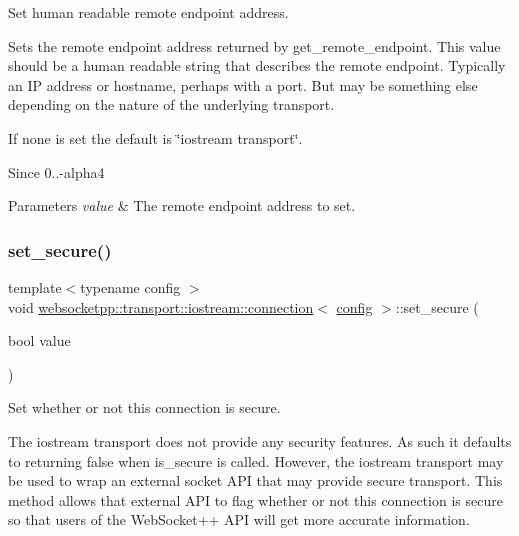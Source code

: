Set human readable remote endpoint address. 

Sets the remote endpoint address returned by {\ttfamily get\+\_\+remote\+\_\+endpoint}. This value should be a human readable string that describes the remote endpoint. Typically an IP address or hostname, perhaps with a port. But may be something else depending on the nature of the underlying transport.

If none is set the default is \char`\"{}iostream transport\char`\"{}.

\begin{DoxySince}{Since}
0..-\/alpha4
\end{DoxySince}

\begin{DoxyParams}{Parameters}
{\em value} & The remote endpoint address to set. \\
\hline
\end{DoxyParams}
\mbox{\label{classwebsocketpp_1_1transport_1_1iostream_1_1connection_a34443f9921e85115607304397d43cc8f}} 
\subsubsection{\texorpdfstring{set\+\_\+secure()}{set\_secure()}}
{\footnotesize\ttfamily template$<$typename config $>$ \\
void \mbox{\hyperlink{classwebsocketpp_1_1transport_1_1iostream_1_1connection}{websocketpp\+::transport\+::iostream\+::connection}}$<$ \mbox{\hyperlink{classconfig}{config}} $>$\+::set\+\_\+secure (\begin{DoxyParamCaption}\item[{bool}]{value }\end{DoxyParamCaption})\hspace{0.3cm}{\ttfamily [inline]}}



Set whether or not this connection is secure. 

The iostream transport does not provide any security features. As such it defaults to returning false when {\ttfamily is\+\_\+secure} is called. However, the iostream transport may be used to wrap an external socket A\+PI that may provide secure transport. This method allows that external A\+PI to flag whether or not this connection is secure so that users of the Web\+Socket++ A\+PI will get more accurate information.

